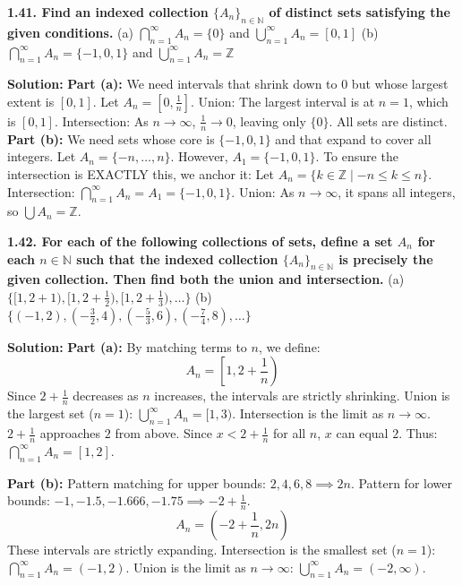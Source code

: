\documentclass[12pt]{article}
\begin{document}
\hrulefill

\textbf{1.41. Find an indexed collection $\{A_n\}_{n \in \mathbb{N}}$ of distinct sets satisfying the given conditions.}
(a) $\bigcap_{n=1}^\infty A_n = \{0\}$ and $\bigcup_{n=1}^\infty A_n = [0, 1]$
(b) $\bigcap_{n=1}^\infty A_n = \{-1, 0, 1\}$ and $\bigcup_{n=1}^\infty A_n = \mathbb{Z}$

\textbf{Solution:}
\textbf{Part (a):} We need intervals that shrink down to $0$ but whose largest extent is $[0, 1]$.
Let $A_n = [0, \frac{1}{n}]$. 
Union: The largest interval is at $n=1$, which is $[0, 1]$.
Intersection: As $n \to \infty$, $\frac{1}{n} \to 0$, leaving only $\{0\}$. All sets are distinct.
\textbf{Part (b):} We need sets whose core is $\{-1, 0, 1\}$ and that expand to cover all integers.
Let $A_n = \{-n, \dots, n\}$. However, $A_1 = \{-1, 0, 1\}$. To ensure the intersection is EXACTLY this, we anchor it:
Let $A_n = \{k \in \mathbb{Z} \mid -n \le k \le n\}$.
Intersection: $\bigcap_{n=1}^\infty A_n = A_1 = \{-1, 0, 1\}$.
Union: As $n \to \infty$, it spans all integers, so $\bigcup A_n = \mathbb{Z}$.

\hrulefill

\textbf{1.42. For each of the following collections of sets, define a set $A_n$ for each $n \in \mathbb{N}$ such that the indexed collection $\{A_n\}_{n \in \mathbb{N}}$ is precisely the given collection. Then find both the union and intersection.}
(a) $\{[1, 2+1), [1, 2+\frac{1}{2}), [1, 2+\frac{1}{3}), \dots\}$
(b) $\{(-1, 2), (-\frac{3}{2}, 4), (-\frac{5}{3}, 6), (-\frac{7}{4}, 8), \dots\}$

\textbf{Solution:}
\textbf{Part (a):} By matching terms to $n$, we define:
\[ A_n = \left[1, 2 + \frac{1}{n}\right) \]
Since $2 + \frac{1}{n}$ decreases as $n$ increases, the intervals are strictly shrinking.
Union is the largest set ($n=1$): $\bigcup_{n=1}^\infty A_n = [1, 3)$.
Intersection is the limit as $n \to \infty$. $2 + \frac{1}{n}$ approaches $2$ from above. Since $x < 2+\frac{1}{n}$ for all $n$, $x$ can equal $2$. Thus: $\bigcap_{n=1}^\infty A_n = [1, 2]$.

\textbf{Part (b):} Pattern matching for upper bounds: $2, 4, 6, 8 \implies 2n$.
Pattern for lower bounds: $-1, -1.5, -1.666, -1.75 \implies -2 + \frac{1}{n}$.
\[ A_n = \left(-2 + \frac{1}{n}, 2n\right) \]
These intervals are strictly expanding. 
Intersection is the smallest set ($n=1$): $\bigcap_{n=1}^\infty A_n = (-1, 2)$.
Union is the limit as $n \to \infty$: $\bigcup_{n=1}^\infty A_n = (-2, \infty)$.

\hrulefill
\end{document}
